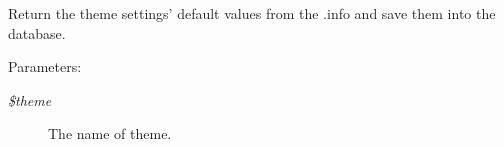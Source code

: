 Return the theme settings' default values from the .info and save them into the database.

\begin{Desc}
\item[Parameters:]
\begin{description}
\item[{\em \$theme}]The name of theme. \end{description}
\end{Desc}
